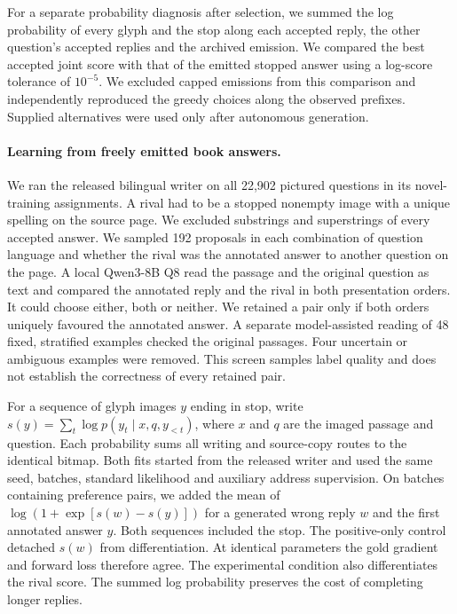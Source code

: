 \documentclass[12pt,a4paper]{article}
\providecommand{\DIFadd}[1]{{\protect\color{blue} \sf #1}} %
\begin{document}
\DIFadd{For a separate probability diagnosis after selection, we summed the log probability of every glyph and the stop along each accepted reply, the other question's accepted replies and the archived emission. We compared the best accepted joint score with that of the emitted stopped answer using a log-score tolerance of $10^{-5}$. We excluded capped emissions from this comparison and independently reproduced the greedy choices along the observed prefixes. Supplied alternatives were used only after autonomous generation.
}

\paragraph{\DIFadd{Learning from freely emitted book answers.}}
\DIFadd{We ran the released bilingual writer on all 22,902 pictured questions in its novel-training assignments. A rival had to be a stopped nonempty image with a unique spelling on the source page. We excluded substrings and superstrings of every accepted answer. We sampled 192 proposals in each combination of question language and whether the rival was the annotated answer to another question on the page. A local Qwen3-8B Q8 read the passage and the original question as text and compared the annotated reply and the rival in both presentation orders. It could choose either, both or neither. We retained a pair only if both orders uniquely favoured the annotated answer. A separate model-assisted reading of 48 fixed, stratified examples checked the original passages. Four uncertain or ambiguous examples were removed. This screen samples label quality and does not establish the correctness of every retained pair.
}

\DIFadd{For a sequence of glyph images $y$ ending in stop, write $s(y)=\sum_t\log p(y_t\mid x,q,y_{<t})$, where $x$ and $q$ are the imaged passage and question. Each probability sums all writing and source-copy routes to the identical bitmap. Both fits started from the released writer and used the same seed, batches, standard likelihood and auxiliary address supervision. On batches containing preference pairs, we added the mean of $\log(1+\exp[s(w)-s(y)])$ for a generated wrong reply $w$ and the first annotated answer $y$. Both sequences included the stop. The positive-only control detached $s(w)$ from differentiation. At identical parameters the gold gradient and forward loss therefore agree. The experimental condition also differentiates the rival score. The summed log probability preserves the cost of completing longer replies.
}
\end{document}

